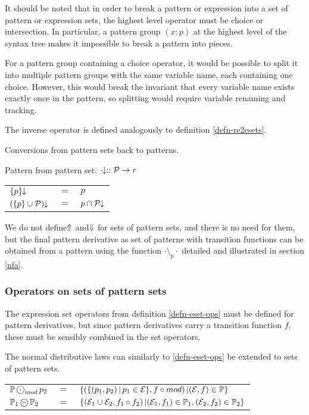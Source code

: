 It should be noted that in order to break a pattern or expression into a set of
pattern or expression sets, the highest level operator must be choice or
intersection. In particular, a pattern group $(x:p)$ at the highest level of the
syntax tree makes it impossible to break a pattern into pieces.

For a pattern group containing a choice operator, it would be possible to split
it into multiple pattern groups with the same variable name, each containing one
choice. However, this would break the invariant that every variable name exists
exactly once in the pattern, so splitting would require variable renaming and
tracking.

The inverse operator is defined analogously to definition \ref{defn-re2esets}.

\begin{defn}
   \label{defn-re2psets}
   Conversions from pattern sets back to patterns.

   Pattern from pattern set:
   $\cdot\!\!\downarrow :: \mathcal{P} \to r$

   \begin{tabular}{lll}
      $\{p\}\!\!\downarrow$			& $=$	& $p$				\\
      $(\{p\} \cup \mathcal{P})\!\!\downarrow$	& $=$	& $p \cap \mathcal{P}\!\!\downarrow$	\\
   \end{tabular}
\end{defn}

We do not define $\!\!\Uparrow$ and $\!\!\Downarrow$ for sets of pattern sets, and
there is no need for them, but the final pattern derivative as set of patterns
with transition functions can be obtained from a pattern using the function
$\cdot \setminus_p \cdot$ detailed and illustrated in section \ref{nfa}.


\subsubsection{Operators on sets of pattern sets}

The expression set operators from definition \ref{defn-eset-ops} must be defined
for pattern derivatives, but since pattern derivatives carry a transition
function $f$, these must be sensibly combined in the set operators.

\begin{defn}
   \label{defn-pset-ops}
   The normal distributive laws can similarly to \ref{defn-eset-ops} be extended
   to sets of pattern sets.

   \begin{tabular}{lll}
      $\psets \circledcdot_{mod} p_2$
         & $=$
         & $\{ (\{ (p_1, p_2) \operatorname{|} p_1 \in \mathcal{E} \}, f \circ mod) \operatorname{|} (\mathcal{E}, f) \in \mathbb{P} \}$
         \\

      $\mathbb{P}_1 \operatorname{\text{\textcircled{\tiny$\cap$}}} \mathbb{P}_2$
         & $=$
         & $\{
              (\mathcal{E}_1 \cup \mathcal{E}_2, f_1 \circ f_2)
              \operatorname{|} (\mathcal{E}_1, f_1) \in \mathbb{P}_1, (\mathcal{E}_2, f_2) \in \mathbb{P}_2
           \}$
         \\
   \end{tabular}
\end{defn}


